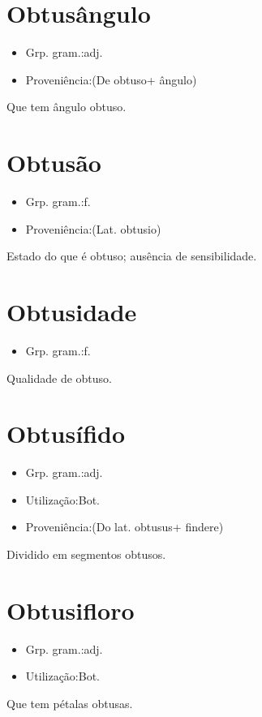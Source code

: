 \section{Obtusângulo}
\begin{itemize}
\item {Grp. gram.:adj.}
\end{itemize}
\begin{itemize}
\item {Proveniência:(De \textunderscore obtuso\textunderscore  + \textunderscore ângulo\textunderscore )}
\end{itemize}
Que tem ângulo obtuso.
\section{Obtusão}
\begin{itemize}
\item {Grp. gram.:f.}
\end{itemize}
\begin{itemize}
\item {Proveniência:(Lat. \textunderscore obtusio\textunderscore )}
\end{itemize}
Estado do que é obtuso; ausência de sensibilidade.
\section{Obtusidade}
\begin{itemize}
\item {Grp. gram.:f.}
\end{itemize}
Qualidade de obtuso.
\section{Obtusífido}
\begin{itemize}
\item {Grp. gram.:adj.}
\end{itemize}
\begin{itemize}
\item {Utilização:Bot.}
\end{itemize}
\begin{itemize}
\item {Proveniência:(Do lat. \textunderscore obtusus\textunderscore  + \textunderscore findere\textunderscore )}
\end{itemize}
Dividido em segmentos obtusos.
\section{Obtusifloro}
\begin{itemize}
\item {Grp. gram.:adj.}
\end{itemize}
\begin{itemize}
\item {Utilização:Bot.}
\end{itemize}
Que tem pétalas obtusas.
